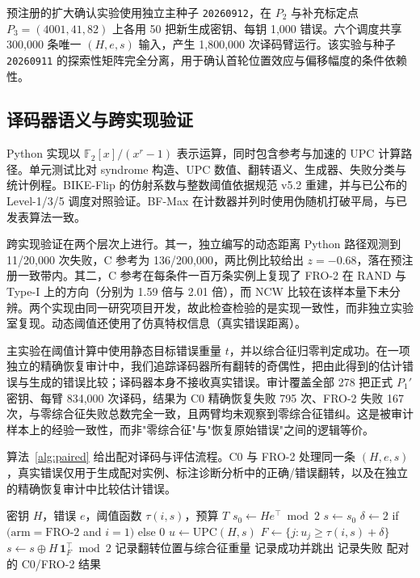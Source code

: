 \documentclass[UTF8,a4paper,10pt,twocolumn]{ctexart}
\begin{document}
预注册的扩大确认实验使用独立主种子 \texttt{20260912}，在 $P_2$ 与补充标定点 $P_3=(4001,41,82)$ 上各用 50 把新生成密钥、每钥 1{,}000 错误。六个调度共享 300{,}000 条唯一 $(H,e,s)$ 输入，产生 1{,}800{,}000 次译码臂运行。该实验与种子 \texttt{20260911} 的探索性矩阵完全分离，用于确认首轮位置效应与偏移幅度的条件依赖性。

\subsection{译码器语义与跨实现验证}

Python 实现以 $\mathbb{F}_2[x]/(x^r-1)$ 表示运算，同时包含参考与加速的 UPC 计算路径。单元测试比对 syndrome 构造、UPC 数值、翻转语义、生成器、失败分类与统计例程。BIKE-Flip 的仿射系数与整数阈值依据规范 v5.2 重建，并与已公布的 Level-1/3/5 调度对照验证。BF-Max 在计数器并列时使用伪随机打破平局，与已发表算法一致。

跨实现验证在两个层次上进行。其一，独立编写的动态距离 Python 路径观测到 11/20{,}000 次失败，C 参考为 136/200{,}000，两比例比较给出 $z=-0.68$，落在预注册一致带内。其二，C 参考在每条件一百万条实例上复现了 FRO-2 在 RAND 与 Type-I 上的方向（分别为 1.59 倍与 2.01 倍），而 NCW 比较在该样本量下未分辨。两个实现由同一研究项目开发，故此检查检验的是实现一致性，而非独立实验室复现。动态阈值还使用了仿真特权信息（真实错误距离）。

主实验在阈值计算中使用静态目标错误重量 $t$，并以综合征归零判定成功。在一项独立的精确恢复审计中，我们追踪译码器所有翻转的奇偶性，把由此得到的估计错误与生成的错误比较；译码器本身不接收真实错误。审计覆盖全部 278 把正式 $P_1'$ 密钥、每臂 834{,}000 次译码，结果为 C0 精确恢复失败 795 次、FRO-2 失败 167 次，与零综合征失败总数完全一致，且两臂均未观察到零综合征错纠。这是被审计样本上的经验一致性，而非"零综合征"与"恢复原始错误"之间的逻辑等价。

算法~\ref{alg:paired} 给出配对译码与评估流程。C0 与 FRO-2 处理同一条 $(H,e,s)$，真实错误仅用于生成配对实例、标注诊断分析中的正确/错误翻转，以及在独立的精确恢复审计中比较估计错误。

\begin{algorithm}[t]
\caption{配对 C0/FRO-2 译码与评估}\label{alg:paired}
\begin{algorithmic}[1]
\Require 密钥 $H$，错误 $e$，阈值函数 $\tau(i,s)$，预算 $T$
\State $s_0 \gets H e^{\top} \bmod 2$ 
  \State $s\gets s_0$
    \State $\delta \gets 2$ if $(\mathrm{arm}=\mathrm{FRO\text{-}2}$ and $i=1)$ else $0$
    \State $u \gets \mathrm{UPC}(H,s)$
    \State $F \gets \{j: u_j \ge \tau(i,s)+\delta\}$
    \State $s \gets s \oplus H\,\mathbf{1}_F^{\top} \bmod 2$
    \State 记录翻转位置与综合征重量
     记录成功并跳出 \EndIf
  \EndFor
   记录失败 \EndIf
\EndFor
\State \Return 配对的 C0/FRO-2 结果
\end{algorithmic}
\end{algorithm}
\end{document}

